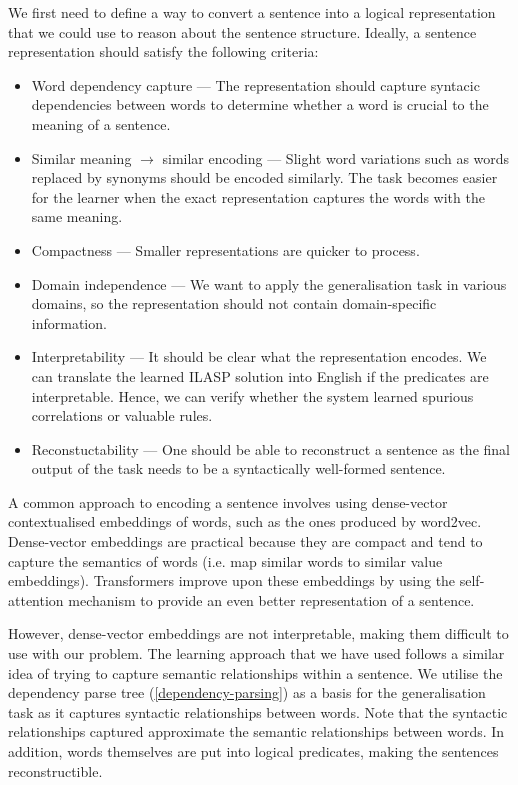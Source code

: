 We first need to define a way to convert a sentence into a logical representation that we could use to reason about the sentence structure.
Ideally, a sentence representation should satisfy the following criteria:
\begin{itemize}
    \item Word dependency capture --- The representation should capture syntacic dependencies between words to determine whether a word is crucial to the meaning of a sentence.
    \item Similar meaning $\rightarrow$ similar encoding --- Slight word variations such as words replaced by synonyms should be encoded similarly. The task becomes easier for the learner when the exact representation captures the words with the same meaning.
    \item Compactness --- Smaller representations are quicker to process. 
    \item Domain independence --- We want to apply the generalisation task in various domains, so the representation should not contain domain-specific information.
    \item Interpretability --- It should be clear what the representation encodes. We can translate the learned ILASP solution into English if the predicates are interpretable. Hence, we can verify whether the system learned spurious correlations or valuable rules.
    \item Reconstuctability --- One should be able to reconstruct a sentence as the final output of the task needs to be a syntactically well-formed sentence.
\end{itemize}


A common approach to encoding a sentence involves using dense-vector contextualised embeddings of words, such as the ones produced by word2vec.
Dense-vector embeddings are practical because they are compact and tend to capture the semantics of words (i.e. map similar words to similar value embeddings).
Transformers improve upon these embeddings by using the self-attention mechanism to provide an even better representation of a sentence.

However, dense-vector embeddings are not interpretable, making them difficult to use with our problem. 
The learning approach that we have used follows a similar idea of trying to capture semantic relationships within a sentence.
We utilise the dependency parse tree (\ref{dependency-parsing}) as a basis for the generalisation task as it captures syntactic relationships between words.
Note that the syntactic relationships captured approximate the semantic relationships between words.
In addition, words themselves are put into logical predicates, making the sentences reconstructible.


